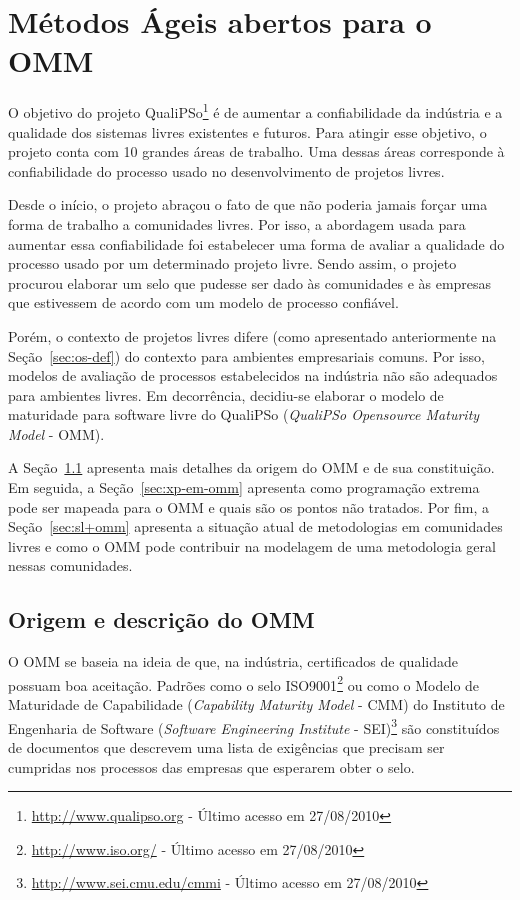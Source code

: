 \chapter{Métodos Ágeis abertos para o OMM}
\label{cap:omm}

O objetivo do projeto QualiPSo\footnote{\url{http://www.qualipso.org}
  - Último acesso em 27/08/2010} é de aumentar a confiabilidade da
indústria e a qualidade dos sistemas livres existentes e futuros. Para
atingir esse objetivo, o projeto conta com 10 grandes áreas de
trabalho. Uma dessas áreas corresponde à confiabilidade do processo
usado no desenvolvimento de projetos livres.

Desde o início, o projeto abraçou o fato de que não poderia jamais
forçar uma forma de trabalho a comunidades livres. Por isso, a
abordagem usada para aumentar essa confiabilidade foi estabelecer uma
forma de avaliar a qualidade do processo usado por um determinado
projeto livre. Sendo assim, o projeto procurou elaborar um selo que
pudesse ser dado às comunidades e às empresas que estivessem de acordo
com um modelo de processo confiável.

Porém, o contexto de projetos livres difere (como apresentado
anteriormente na Seção~\ref{sec:os-def}) do contexto para ambientes
empresariais comuns. Por isso, modelos de avaliação de processos
estabelecidos na indústria não são adequados para ambientes livres. Em
decorrência, decidiu-se elaborar o modelo de maturidade para software
livre do QualiPSo (\textit{QualiPSo Opensource Maturity Model} - OMM).

A Seção~\ref{sec:o-que-eh-omm} apresenta mais detalhes da origem do
OMM e de sua constituição. Em seguida, a Seção~\ref{sec:xp-em-omm}
apresenta como programação extrema pode ser mapeada para o OMM e quais
são os pontos não tratados. Por fim, a Seção~\ref{sec:sl+omm}
apresenta a situação atual de metodologias em comunidades livres e
como o OMM pode contribuir na modelagem de uma metodologia geral
nessas comunidades.

\section{Origem e descrição do OMM}
\label{sec:o-que-eh-omm}

O OMM se baseia na ideia de que, na indústria, certificados de
qualidade possuam boa aceitação. Padrões como o selo
ISO9001\footnote{\url{http://www.iso.org/} - Último acesso em
  27/08/2010} ou como o Modelo de Maturidade de Capabilidade
(\textit{Capability Maturity Model} - CMM) do Instituto de Engenharia
de Software (\textit{Software Engineering Institute} -
SEI)\footnote{\url{http://www.sei.cmu.edu/cmmi} - Último acesso em
  27/08/2010} são constituídos de documentos que descrevem uma lista
de exigências que precisam ser cumpridas nos processos das empresas
que esperarem obter o selo.

